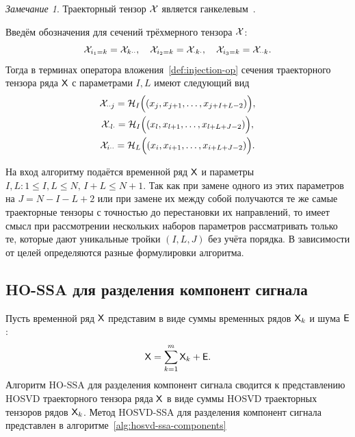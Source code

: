 \documentclass[specialist,
    substylefile = spbu.rtx,
    subf,href,colorlinks=true, 12pt]{disser}
\theoremstyle{plain}
\theoremstyle{definition}
\theoremstyle{remark}
\newtheorem*{remark}{Замечание}
\begin{document}
    \begin{remark}
        Траекторный тензор $\mathcal{X}$ является ганкелевым~\cite{hankel-tensor}.
    \end{remark}

    Введём обозначения для сечений трёхмерного тензора $\mathcal{X}$:
    \[
        \mathcal{X}_{i_1=k} = \mathcal{X}_{k \cdot \cdot}, \quad 
        \mathcal{X}_{i_2=k} = \mathcal{X}_{\cdot k \cdot}, \quad 
        \mathcal{X}_{i_3=k} = \mathcal{X}_{\cdot \cdot k}.
    \]
    Тогда в терминах оператора вложения~\ref{def:injection-op} сечения траекторного тензора ряда $\mathsf{X}$
    с параметрами $I, L$ имеют следующий вид
    \begin{gather*}
        \mathcal{X}_{\cdot \cdot j}= \mathcal{H}_I \Big((x_j, x_{j+1}, \ldots, x_{j+I+L-2})\Big),\\
        \mathcal{X}_{\cdot l \cdot}= \mathcal{H}_I \Big((x_l, x_{l+1}, \ldots, x_{l+L+J-2})\Big),\\
        \mathcal{X}_{i\cdot \cdot}=\mathcal{H}_L \Big((x_i, x_{i+1}, \ldots, x_{i+L+J-2})\Big).
    \end{gather*}
    
    На вход алгоритму подаётся временной ряд $\mathsf{X}$ и параметры $I,L: 1\leqslant I,L \leqslant N,\, I + L \leqslant N + 1$.
    Так как при замене одного из этих параметров на $J=N-I-L+2$ или при замене их между собой получаются
    те же самые траекторные тензоры с точностью до перестановки их направлений, то имеет смысл при
    рассмотрении нескольких наборов параметров рассматривать только те, которые дают уникальные тройки $(I, L, J)$
    без учёта порядка.
    В зависимости от целей определяются разные формулировки алгоритма.
   
   
   \subsection{HO-SSA для разделения компонент сигнала}\label{ho-ssa-sep}
   Пусть временной ряд $\mathsf{X}$ представим в виде суммы временных рядов $\mathsf{X}_k$ и шума $\mathsf{E}$:
   \[
        \mathsf{X} = \sum_{k=1}^{m} \mathsf{X}_k + \mathsf{E}.
   \] 
   Алгоритм HO-SSA для разделения компонент сигнала сводится к представлению HOSVD траекторного тензора ряда
   $\mathsf{X}$ в виде суммы HOSVD траекторных тензоров рядов $\mathsf{X}_k$.
   Метод HOSVD-SSA для разделения компонент сигнала представлен в алгоритме~\ref{alg:hosvd-ssa-components}
    
\end{document}
